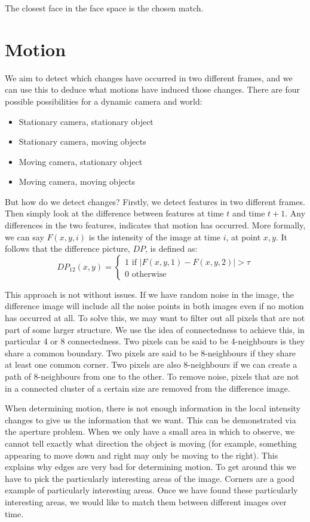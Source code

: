 \documentclass{article}
\begin{document}
	The closest face in the face space is the chosen match.
	\section{Motion}
	We aim to detect which changes have occurred in two different frames, and we can use this to deduce what motions have induced those changes. There are four possible possibilities for a dynamic camera and world:
	\begin{itemize}
		\item Stationary camera, stationary object
		\item Stationary camera, moving objects
		\item Moving camera, stationary object
		\item Moving camera, moving objects
	\end{itemize}
	
	But how do we detect changes? Firstly, we detect features in two different frames. Then simply look at the difference between features at time $t$ and time $t + 1$. Any differences in the two features, indicates that motion has occurred. More formally, we can say $F(x, y, i)$ is the intensity of the image at time $i$, at point $x, y$. It follows that the difference picture, $DP$, is defined as:
	\[ DP_{12}(x, y) = \begin{cases}
		1 \text{ if } |F(x, y, 1) - F(x, y, 2)| > \tau \\
		0 \text{ otherwise}
		\end{cases} \]
		
	This approach is not without issues. If we have random noise in the image, the difference image will include all the noise points in both images even if no motion has occurred at all. To solve this, we may want to filter out all pixels that are not part of some larger structure. We use the idea of connectedness to achieve this, in particular 4 or 8 connectedness. Two pixels can be said to be 4-neighbours is they share a common boundary. Two pixels are said to be 8-neighbours if they share at least one common corner. Two pixels are also 8-neighbours if we can create a path of 8-neighbours from one to the other. To remove noise, pixels that are not in a connected cluster of a certain size are removed from the difference image.
	
	\par 
	When determining motion, there is not enough information in the local intensity changes to give us the information that we want. This can be demonstrated via the aperture problem. When we only have a small area in which to observe, we cannot tell exactly what direction the object is moving (for example, something appearing to move down and right may only be moving to the right). This explains why edges are very bad for determining motion. To get around this we have to pick the particularly interesting areas of the image. Corners are a good example of particularly interesting areas. Once we have found these particularly interesting areas, we would like to match them between different images over time.
	
\end{document}
